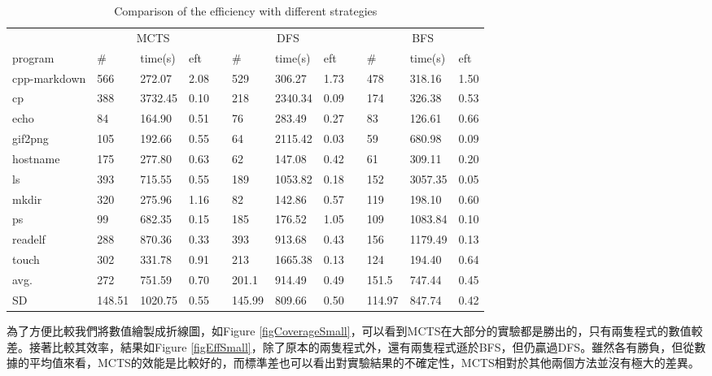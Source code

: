 \documentclass[12pt,a4paper,oneside]{book}
\begin{document}
\begin{table}[htbp]
\centering
\caption{Comparison of the efficiency with different strategies}
\label{testMethod}
\begin{tabular}{@{}llllllllllll@{}} \toprule
             & \multicolumn{3}{c}{MCTS} & \phantom{abc} & \multicolumn{3}{c}{DFS} & \phantom{abc} & \multicolumn{3}{c}{BFS} \\ \cmidrule{2-4} \cmidrule{6-8} \cmidrule{10-12}
program      & \#   & time(s)   & eft   & & \#   & time(s)   & eft   & & \#    & time(s)   & eft      \\ \midrule
cpp-markdown & 566    & 272.07 & 2.08 & & 529    & 306.27& 1.73  & & 478     & 318.16 & 1.50   \\
cp           & 388    & 3732.45& 0.10 & & 218    &2340.34& 0.09  & & 174     & 326.38 & 0.53   \\
echo         &  84    & 164.90 & 0.51 & &  76    & 283.49& 0.27  & &  83     & 126.61 & 0.66   \\
gif2png      & 105    & 192.66 & 0.55 & &  64    &2115.42& 0.03  & &  59     & 680.98 & 0.09   \\ 
hostname     & 175    & 277.80 & 0.63 & &  62    & 147.08& 0.42  & &  61     & 309.11 & 0.20   \\
ls           & 393    & 715.55 & 0.55 & & 189    &1053.82& 0.18  & & 152     &3057.35 & 0.05   \\
mkdir        & 320    & 275.96 & 1.16 & &  82    & 142.86& 0.57  & & 119     & 198.10 & 0.60   \\
ps           &  99    & 682.35 & 0.15 & & 185    & 176.52& 1.05  & & 109     &1083.84 & 0.10   \\
readelf      & 288    & 870.36 & 0.33 & & 393    & 913.68& 0.43  & & 156     &1179.49 & 0.13   \\
touch        & 302    & 331.78 & 0.91 & & 213    &1665.38& 0.13  & & 124     & 194.40 & 0.64   \\ \hline
avg.         & 272    & 751.59 & 0.70 & & 201.1  & 914.49& 0.49  & & 151.5   & 747.44 & 0.45   \\
SD           & 148.51 &1020.75 & 0.55 & & 145.99 & 809.66& 0.50  & & 114.97  & 847.74 & 0.42   \\ \bottomrule
\end{tabular}
\end{table}

為了方便比較我們將數值繪製成折線圖，如Figure \ref{figCoverageSmall}，可以看到MCTS在大部分的實驗都是勝出的，只有兩隻程式的數值較差。接著比較其效率，結果如Figure \ref{figEffSmall}，除了原本的兩隻程式外，還有兩隻程式遜於BFS，但仍贏過DFS。雖然各有勝負，但從數據的平均值來看，MCTS的效能是比較好的，而標準差也可以看出對實驗結果的不確定性，MCTS相對於其他兩個方法並沒有極大的差異。
\end{document}
